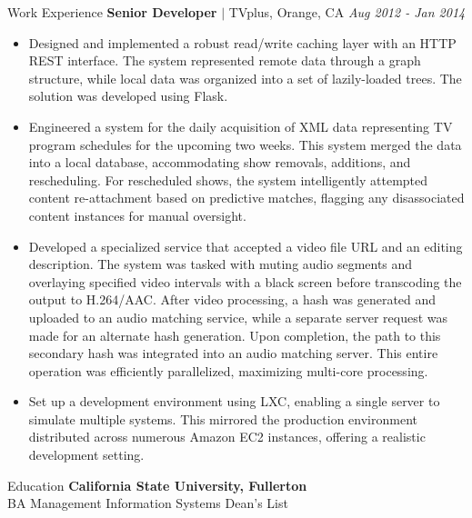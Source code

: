 \documentclass{resume} %
\newcommand{\resumeItem}[1]{
  \item\small{
    {#1 \vspace{-2pt}}
  }
}
\newcommand{\resumeItemListStart}{\begin{itemize}}
\newcommand{\resumeItemListEnd}{\end{itemize}\vspace{-5pt}}
\begin{document}
\begin{rSection}{Work Experience}
{\bf Senior Developer}{ $|$ TVplus, Orange, CA} \hfill {\em Aug 2012 - Jan 2014}
\resumeItemListStart
    \resumeItem{Designed and implemented a robust read/write caching layer with an HTTP REST interface. The system represented remote data through a graph structure, while local data was organized into a set of lazily-loaded trees. The solution was developed using Flask.}
    \resumeItem{Engineered a system for the daily acquisition of XML data representing TV program schedules for the upcoming two weeks. This system merged the data into a local database, accommodating show removals, additions, and rescheduling. For rescheduled shows, the system intelligently attempted content re-attachment based on predictive matches, flagging any disassociated content instances for manual oversight.}
    \resumeItem{Developed a specialized service that accepted a video file URL and an editing description. The system was tasked with muting audio segments and overlaying specified video intervals with a black screen before transcoding the output to H.264/AAC. After video processing, a hash was generated and uploaded to an audio matching service, while a separate server request was made for an alternate hash generation. Upon completion, the path to this secondary hash was integrated into an audio matching server. This entire operation was efficiently parallelized, maximizing multi-core processing.}
    \resumeItem{Set up a development environment using LXC, enabling a single server to simulate multiple systems. This mirrored the production environment distributed across numerous Amazon EC2 instances, offering a realistic development setting.} \\
\resumeItemListEnd

\end{rSection}



\begin{rSection}{Education}
{\bf California State University, Fullerton}
\\BA Management Information Systems\hfill { Dean's List }

\end{rSection}
\end{document}
